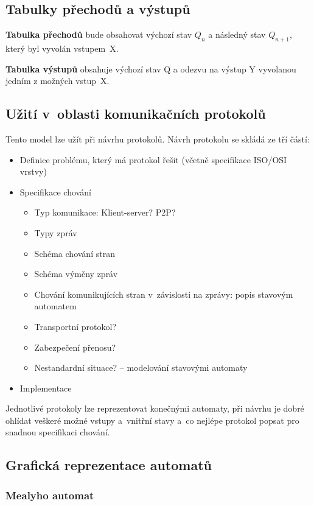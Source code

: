 \subsection{Tabulky přechodů a výstupů}
\textbf{Tabulka přechodů} bude obsahovat výchozí stav $Q_n$ a následný stav $Q_{n+1}$, který byl vyvolán vstupem~X.

\textbf{Tabulka výstupů}  obsahuje výchozí stav Q a odezvu na výstup Y vyvolanou jedním z možných vstup~X.

\subsection{Užití v~oblasti komunikačních protokolů}
Tento model lze užít při návrhu protokolů. Návrh protokolu se skládá ze tří částí:
\begin{itemize}
    \item Definice problému, který má protokol řešit (včetně specifikace ISO/OSI vrstvy)
    \item Specifikace chování
    \begin{itemize}
        \item Typ komunikace: Klient-server? P2P?
        \item Typy zpráv
        \item Schéma chování stran
        \item Schéma výměny zpráv
        \item Chování komunikujících stran v~závislosti na zprávy: popis stavovým automatem
        \item Transportní protokol?
        \item Zabezpečení přenosu?
        \item Nestandardní situace? -- modelování stavovými automaty
    \end{itemize}
    \item Implementace
\end{itemize}

Jednotlivé protokoly lze reprezentovat konečnými automaty, při návrhu je dobré ohlídat veškeré možné vstupy a~vnitřní stavy a~co nejlépe protokol popsat pro snadnou specifikaci chování.

\subsection{Grafická reprezentace automatů}

\subsubsection{Mealyho automat}

